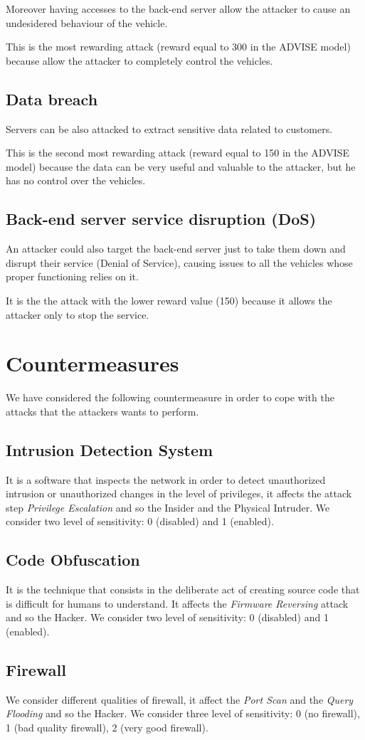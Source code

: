 \noindent Moreover having accesses to the back-end server allow the attacker to cause an undesidered behaviour of the vehicle.

\noindent This is the most rewarding attack (reward equal to 300 in the ADVISE model) because allow the attacker to completely control the vehicles.

\subsection*{Data breach}
Servers can be also attacked to extract sensitive data related to customers.

\noindent This is the second most rewarding attack (reward equal to 150 in the ADVISE model) because the data can be very useful and valuable to the attacker, but he has no control over the vehicles.

\subsection*{Back-end server service disruption (DoS)}
An attacker could also target the back-end server just to take them down and disrupt their service (Denial of Service), causing issues to all the vehicles whose proper functioning relies on it.

\noindent It is the the attack with the lower reward value (150) because it allows the attacker only to stop the service.

\section{Countermeasures}
\noindent We have considered the following countermeasure in order to cope with the attacks that the attackers wants to perform.

\subsection*{Intrusion Detection System}
\noindent It is a software that inspects the network in order to detect unauthorized intrusion or unauthorized changes in the level of privileges, it affects the attack step \textit{Privilege Escalation} and so the Insider and the Physical Intruder. We consider two level of sensitivity: 0 (disabled) and 1 (enabled).


\subsection*{Code Obfuscation}
\noindent It is the technique that consists in the deliberate act of creating source code that is difficult for humans to understand. It affects the \textit{Firmware Reversing} attack and so the Hacker. We consider two level of sensitivity: 0 (disabled) and 1 (enabled).

\subsection*{Firewall}
\noindent We consider different qualities of firewall, it affect the \textit{Port Scan} and the \textit{Query Flooding} and so the Hacker. We consider three level of sensitivity: 0 (no firewall), 1 (bad quality firewall), 2 (very good firewall).




